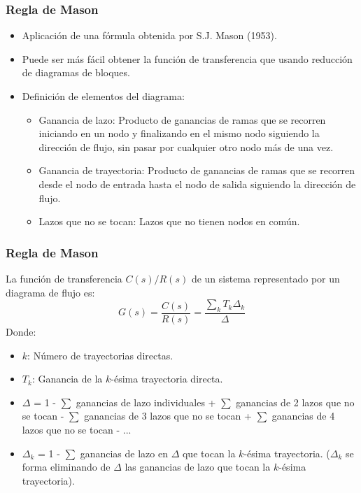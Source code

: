 \documentclass[aspectratio=169,handout]{beamer}
\theoremstyle{definition}
\theoremstyle{plain}
\theoremstyle{remark}
\begin{document}
\begin{frame}[<+->]\frametitle{Regla de Mason}
\begin{itemize}
	\item Aplicación de una fórmula obtenida por S.J. Mason (1953).
	\item Puede ser más fácil obtener la función de transferencia que usando reducción de diagramas de bloques.
	\item Definición de elementos del diagrama:
	\begin{itemize}
		\item Ganancia de lazo: Producto de ganancias de ramas que se recorren iniciando en un nodo y finalizando en el mismo nodo siguiendo la dirección de flujo, sin pasar por cualquier otro nodo más de una vez.
		\item Ganancia de trayectoria: Producto de ganancias de ramas que se recorren desde el nodo de entrada hasta el nodo de salida siguiendo la dirección de flujo.
		\item Lazos que no se tocan: Lazos que no tienen nodos en común.
	\end{itemize}
\end{itemize}
\end{frame}

\begin{frame}[<+->]\frametitle{Regla de Mason}
\begin{theorem}
\footnotesize
La función de transferencia $C(s)/R(s)$	de un sistema representado por un diagrama de flujo es:
\begin{equation*}
	G(s) = \frac{C(s)}{R(s)} = \frac{\sum_k T_k \Delta_k}{\Delta}		
\end{equation*}	
Donde:
\begin{itemize}
	\item $k$: Número de trayectorias directas.
	\item $T_k$: Ganancia de la $k$-ésima trayectoria directa.
	\item $\Delta$ = 1 - $\sum$ ganancias de lazo individuales + $\sum$ ganancias de 2 lazos que no se tocan - $\sum$ ganancias de 3 lazos que no se tocan + $\sum$ ganancias de 4 lazos que no se tocan - ...
	\item $\Delta_k$ = 1 - $\sum$ ganancias de lazo en $\Delta$ que tocan la $k$-ésima trayectoria. ($\Delta_k$ se forma eliminando de $\Delta$ las ganancias de lazo que tocan la $k$-ésima trayectoria).
\end{itemize}
\end{theorem}
\end{frame}
\end{document}
